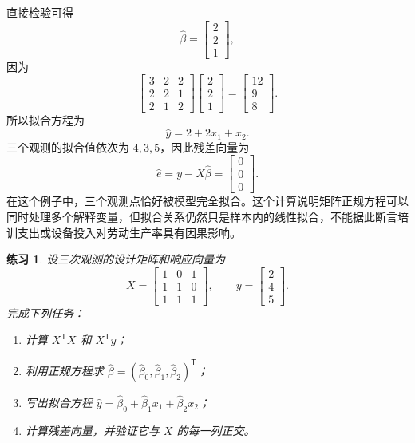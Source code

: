 \documentclass[UTF8,fontset=fandol,11pt]{ctexart}
\newtheorem{exercise}[definition]{练习}
\begin{document}
直接检验可得
\[
\hat\beta=
\begin{bmatrix}2\\2\\1\end{bmatrix},
\]
因为
\[
\begin{bmatrix}3&2&2\\2&2&1\\2&1&2\end{bmatrix}
\begin{bmatrix}2\\2\\1\end{bmatrix}
=
\begin{bmatrix}12\\9\\8\end{bmatrix}.
\]
所以拟合方程为
\[
\hat y=2+2x_1+x_2.
\]
三个观测的拟合值依次为 $4,3,5$，因此残差向量为
\[
\hat e=y-X\hat\beta=
\begin{bmatrix}0\\0\\0\end{bmatrix}.
\]
在这个例子中，三个观测点恰好被模型完全拟合。这个计算说明矩阵正规方程可以同时处理多个解释变量，但拟合关系仍然只是样本内的线性拟合，不能据此断言培训支出或设备投入对劳动生产率具有因果影响。\par
\begin{exercise}
\label{mathagent:exercise:49ae28350c6a4abd6936597716c61d2e3cb07c4268424bce9420505d640e7b34}
设三次观测的设计矩阵和响应向量为
\[
X=\begin{bmatrix}1&0&1\\1&1&0\\1&1&1\end{bmatrix},
\qquad
 y=\begin{bmatrix}2\\4\\5\end{bmatrix}.
\]
完成下列任务：
\begin{enumerate}
\item 计算 $X^{\mathsf T}X$ 和 $X^{\mathsf T}y$；
\item 利用正规方程求 $\hat\beta=(\hat\beta_0,\hat\beta_1,\hat\beta_2)^{\mathsf T}$；
\item 写出拟合方程 $\hat y=\hat\beta_0+\hat\beta_1x_1+\hat\beta_2x_2$；
\item 计算残差向量，并验证它与 $X$ 的每一列正交。\end{enumerate}
\end{exercise}
\end{document}

